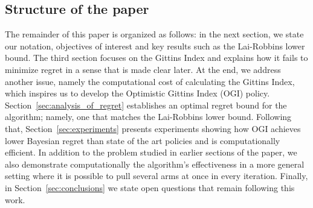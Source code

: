 \subsection{Structure of the paper}
The remainder of this paper is organized as follows: in the next section, we state our notation, objectives of interest 
and key results such as the Lai-Robbins lower bound. The third section focuses on the Gittins Index and explains how it fails to minimize regret in a sense that is made clear later. At the end, we address another issue, namely the computational cost of calculating the Gittins Index, which inspires us to develop the Optimistic Gittins Index (OGI) policy. Section~\ref{sec:analysis_of_regret} establishes an optimal regret bound for the algorithm; namely, one that matches the Lai-Robbins lower bound. Following that, Section~\ref{sec:experiments} presents experiments showing how OGI achieves lower Bayesian regret than state of the art policies and is computationally efficient. In addition to the problem studied in earlier sections of the paper, we also demonstrate computationally the algorithm's effectiveness in a more general setting where it is possible to pull several arms at once in every iteration. Finally, in Section~\ref{sec:conclusions} we state open questions that remain following this work.